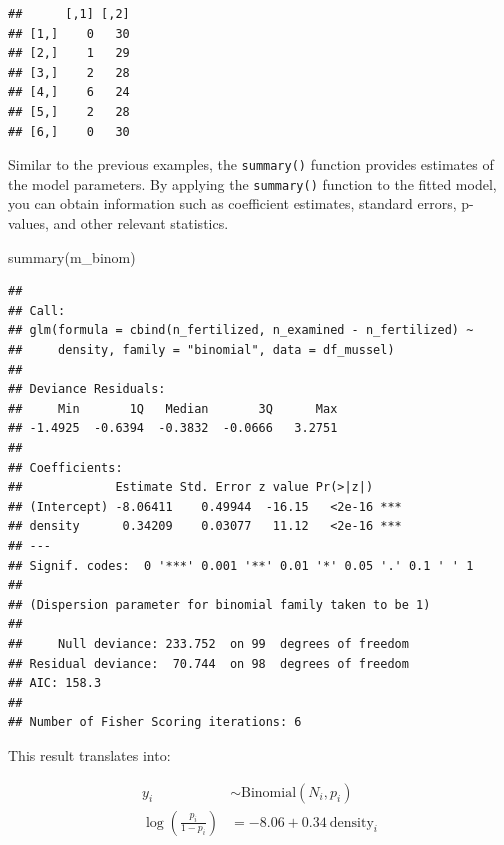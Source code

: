 \documentclass[
]{article}
\newenvironment{Shaded}{\begin{snugshade}}{\end{snugshade}}
\newcommand{\FunctionTok}[1]{\textcolor[rgb]{0.00,0.00,0.00}{#1}}
\newcommand{\NormalTok}[1]{#1}
\newcommand{\SpecialCharTok}[1]{\textcolor[rgb]{0.00,0.00,0.00}{#1}}
\begin{document}
\begin{Shaded}
\end{Shaded}

\begin{verbatim}
##      [,1] [,2]
## [1,]    0   30
## [2,]    1   29
## [3,]    2   28
## [4,]    6   24
## [5,]    2   28
## [6,]    0   30
\end{verbatim}

Similar to the previous examples, the \texttt{summary()} function provides estimates of the model parameters. By applying the \texttt{summary()} function to the fitted model, you can obtain information such as coefficient estimates, standard errors, p-values, and other relevant statistics.

\begin{Shaded}
\begin{Highlighting}[]
\FunctionTok{summary}\NormalTok{(m\_binom)}
\end{Highlighting}
\end{Shaded}

\begin{verbatim}
## 
## Call:
## glm(formula = cbind(n_fertilized, n_examined - n_fertilized) ~ 
##     density, family = "binomial", data = df_mussel)
## 
## Deviance Residuals: 
##     Min       1Q   Median       3Q      Max  
## -1.4925  -0.6394  -0.3832  -0.0666   3.2751  
## 
## Coefficients:
##             Estimate Std. Error z value Pr(>|z|)    
## (Intercept) -8.06411    0.49944  -16.15   <2e-16 ***
## density      0.34209    0.03077   11.12   <2e-16 ***
## ---
## Signif. codes:  0 '***' 0.001 '**' 0.01 '*' 0.05 '.' 0.1 ' ' 1
## 
## (Dispersion parameter for binomial family taken to be 1)
## 
##     Null deviance: 233.752  on 99  degrees of freedom
## Residual deviance:  70.744  on 98  degrees of freedom
## AIC: 158.3
## 
## Number of Fisher Scoring iterations: 6
\end{verbatim}

This result translates into:

\[
\begin{aligned}
y_i &\sim \text{Binomial}(N_i, p_i)\\
\log(\frac{p_i}{1 - p_i}) &= -8.06 + 0.34~\text{density}_i
\end{aligned}
\]
\end{document}
